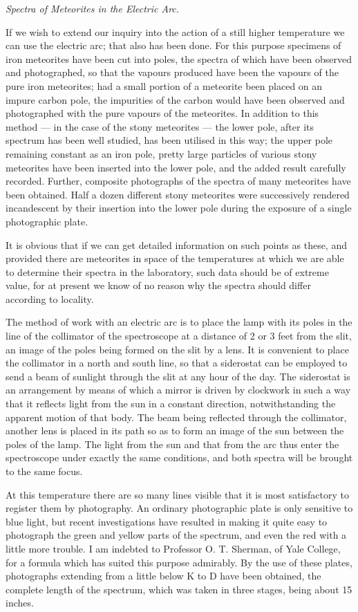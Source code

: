 \documentclass[a4paper, 12pt, oneside, polutonikogreek, english]{article}
\begin{document}
\emph{Spectra of Meteorites in the Electric Arc.}

If we wish to extend our inquiry into the action of a still higher temperature we can use the electric arc; that also has been done. For this purpose specimens of iron meteorites have been cut into poles, the spectra of which have been observed and photographed, so that the vapours produced have been the vapours of the pure iron meteorites; had a small portion of a meteorite been placed on an impure carbon pole, the impurities of the carbon would have been observed and photographed with the pure vapours of the meteorites. In addition to this method --- in the case of the stony meteorites --- the lower pole, after its spectrum has been well studied, has been utilised in this way; the upper pole remaining constant as an iron pole, pretty large particles of various stony meteorites have been inserted into the lower pole, and the added result carefully recorded. Further, composite photographs of the spectra of many meteorites have been obtained. Half a dozen different stony meteorites were successively rendered incandescent by their insertion into the lower pole during the exposure of a single photographic plate.

It is obvious that if we can get detailed information on such points as these, and provided there are meteorites in space of the temperatures at which we are able to determine their spectra in the laboratory, such data should be of extreme value, for at present we know of no reason why the spectra should differ according to locality.

The method of work with an electric arc is to place the lamp with its poles in the line of the collimator of the spectroscope at a distance of 2 or 3 feet from the slit, an image of the poles being formed on the slit by a lens. It is convenient to place the collimator in a north and south line, so that a siderostat can be employed to send a beam of sunlight through the slit at any hour of the day. The siderostat is an arrangement by means of which a mirror is driven by clockwork in such a way that it reflects light from the sun in a constant direction, notwithstanding the apparent motion of that body. The beam being reflected through the collimator, another lens is placed in its path so as to form an image of the sun between the poles of the lamp. The light from the sun and that from the arc thus enter the spectroscope under exactly the same conditions, and both spectra will be brought to the same focus.

At this temperature there are so many lines visible that it is most satisfactory to register them by photography. An ordinary photographic plate is only sensitive to blue light, but recent investigations have resulted in making it quite easy to photograph the green and yellow parts of the spectrum, and even the red with a little more trouble. I am indebted to Professor O. T. Sherman, of Yale College, for a formula which has suited this purpose admirably. By the use of these plates, photographs extending from a little below K to D have been obtained, the complete length of the spectrum, which was taken in three stages, being about 15 inches.
\end{document}
